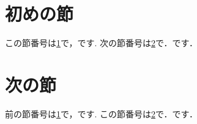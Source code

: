 \documentclass{jsarticle}
\begin{document}
\section{初めの節}
\label{初めの節}
この節番号は\ref{初めの節}で，です.
次の節番号は\ref{次の節}で．です．
\newpage
\section{次の節}
\label{次の節}
前の節番号は\ref{初めの節}で，です.
この節番号は\ref{次の節}で．です．
\end{document}
